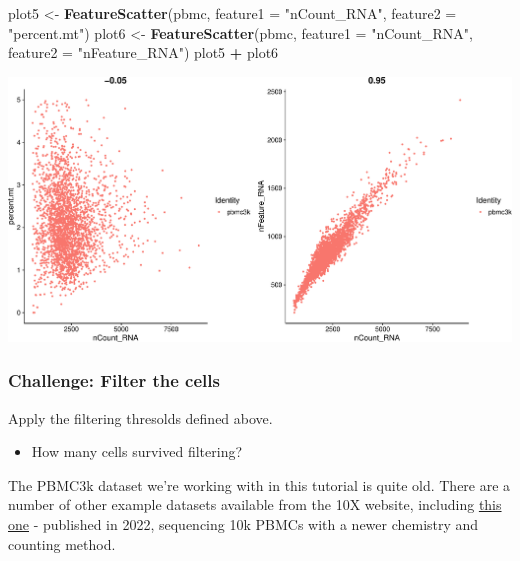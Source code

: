 \documentclass[
]{book}
\newenvironment{Shaded}{\begin{snugshade}}{\end{snugshade}}
\newcommand{\AttributeTok}[1]{\textcolor[rgb]{0.13,0.29,0.53}{#1}}
\newcommand{\FunctionTok}[1]{\textcolor[rgb]{0.13,0.29,0.53}{\textbf{#1}}}
\newcommand{\NormalTok}[1]{#1}
\newcommand{\OtherTok}[1]{\textcolor[rgb]{0.56,0.35,0.01}{#1}}
\newcommand{\SpecialCharTok}[1]{\textcolor[rgb]{0.81,0.36,0.00}{\textbf{#1}}}
\newcommand{\StringTok}[1]{\textcolor[rgb]{0.31,0.60,0.02}{#1}}
\providecommand{\tightlist}{%
  \setlength{\itemsep}{0pt}\setlength{\parskip}{0pt}}
\begin{document}
\begin{Shaded}
\begin{Highlighting}[]
\NormalTok{plot5 }\OtherTok{\textless{}{-}} \FunctionTok{FeatureScatter}\NormalTok{(pbmc, }\AttributeTok{feature1 =} \StringTok{"nCount\_RNA"}\NormalTok{, }\AttributeTok{feature2 =} \StringTok{"percent.mt"}\NormalTok{) }
\NormalTok{plot6 }\OtherTok{\textless{}{-}} \FunctionTok{FeatureScatter}\NormalTok{(pbmc, }\AttributeTok{feature1 =} \StringTok{"nCount\_RNA"}\NormalTok{, }\AttributeTok{feature2 =} \StringTok{"nFeature\_RNA"}\NormalTok{) }
\NormalTok{plot5 }\SpecialCharTok{+}\NormalTok{ plot6}
\end{Highlighting}
\end{Shaded}

\includegraphics{scRNAseqInR_Doco_files/figure-latex/qc2_sidebar-1.pdf}

\subsubsection*{Challenge: Filter the cells}\label{challenge-filter-the-cells}

Apply the filtering thresolds defined above.

\begin{itemize}
\tightlist
\item
  How many cells survived filtering?
\end{itemize}

The PBMC3k dataset we're working with in this tutorial is quite old. There are a number of other example datasets available from the 10X website, including \href{https://www.10xgenomics.com/resources/datasets/10k-human-pbmcs-3-v3-1-chromium-x-with-intronic-reads-3-1-high}{this one} - published in 2022, sequencing 10k PBMCs with a newer chemistry and counting method.
\end{document}

